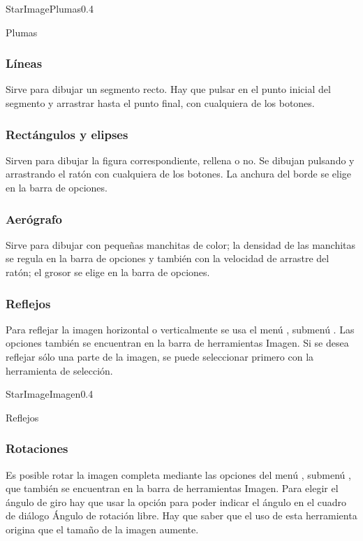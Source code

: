 \begin{figura}{StarImagePlumas}{0.4}
\caption{Plumas}
\label{fig:StarImagePlumas}
\end{figura}


\subsubsection{Líneas}
Sirve para dibujar un segmento recto. Hay que pulsar en el punto inicial del segmento y arrastrar hasta el 
punto final, con cualquiera de los botones.

\subsubsection{Rectángulos y elipses}
Sirven para dibujar la figura correspondiente, rellena o no. Se dibujan pulsando y arrastrando el ratón 
con cualquiera de los botones. La anchura del borde se elige en la barra de opciones.

\subsubsection{Aerógrafo}
Sirve para dibujar con pequeñas manchitas de color; la densidad de las manchitas se regula en la barra de 
opciones y también con la velocidad de arrastre del ratón; el grosor se elige en la barra de opciones.

\subsubsection{Reflejos}
Para reflejar la imagen horizontal o verticalmente se usa el menú
, submenú .  Las opciones también se
encuentran en la barra de herramientas Imagen. Si se desea reflejar
sólo una parte de la imagen, se puede seleccionar primero con la
herramienta de selección.

\begin{figura}{StarImageImagen}{0.4}
\caption{Reflejos}
\label{fig:StarImageImagen}
\end{figura}


\subsubsection{Rotaciones}
Es posible rotar la imagen completa mediante las opciones del menú , submenú ,
que también se encuentran en la barra de herramientas Imagen. Para elegir el ángulo de giro hay 
que usar la opción  para poder indicar el ángulo en el cuadro de diálogo 
Ángulo de rotación libre. Hay que saber que el uso de esta herramienta origina que el tamaño de 
la imagen aumente.


